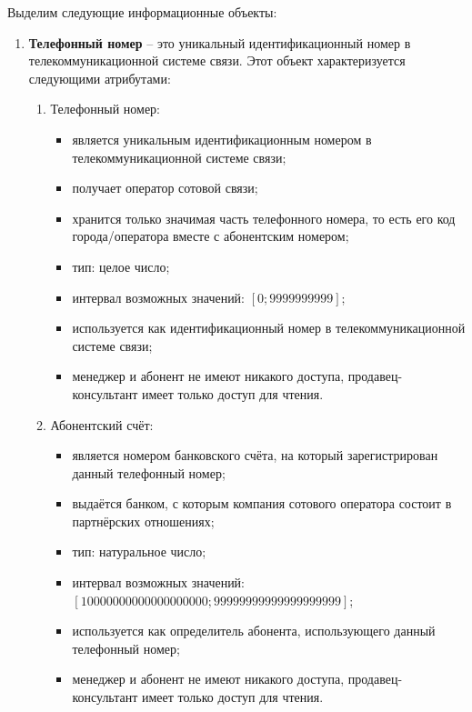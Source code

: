 Выделим следующие информационные объекты:
\begin{enumerate}
    \item \textbf{Телефонный номер} -- это уникальный идентификационный номер в телекоммуникационной системе связи. Этот объект характеризуется следующими атрибутами:
    \begin{enumerate}
        \item Телефонный номер:
        \begin{itemize}
            \item является уникальным идентификационным номером в телекоммуникационной системе связи;
            \item получает оператор сотовой связи;
            \item хранится только значимая часть телефонного номера, то есть его код города/оператора вместе с абонентским номером;
            \item тип: целое число;
            \item интервал возможных значений: $[0; 9 999 999 999]$;
            \item используется как идентификационный номер в телекоммуникационной системе связи;
            \item менеджер и абонент не имеют никакого доступа, продавец-консультант имеет только доступ для чтения.
        \end{itemize}

        \item Абонентский счёт:
        \begin{itemize}
            \item является номером банковского счёта, на который зарегистрирован данный телефонный номер;
            \item выдаётся банком, с которым компания сотового оператора состоит в партнёрских отношениях;
            \item тип: натуральное число;
            \item интервал возможных значений: $[10 000 000 000 000 000 000; 99 999 999 999 999 999 999]$;
            \item используется как определитель абонента, использующего данный телефонный номер;
            \item менеджер и абонент не имеют никакого доступа, продавец-консультант имеет только доступ для чтения.
        \end{itemize}
    \end{enumerate}



\end{enumerate}
